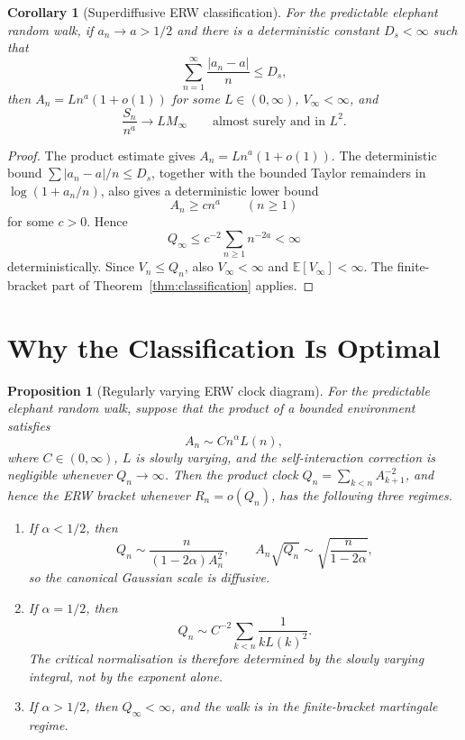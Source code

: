 \documentclass[11pt]{article}
\newtheorem{proposition}{Proposition}
\newtheorem{corollary}{Corollary}
\theoremstyle{definition}
\theoremstyle{remark}
\newcommand{\E}{\mathbb{E}}
\newcommand{\1}{\mathbf{1}}
\begin{document}
\begin{corollary}[Superdiffusive ERW classification]\label{cor:super}
For the predictable elephant random walk, if \(a_n\to a>1/2\) and there is a
deterministic constant \(D_s<\infty\) such
that
\[
  \sum_{n=1}^\infty \frac{|a_n-a|}{n}\le D_s,
\]
then \(A_n=L n^a(1+o(1))\) for some \(L\in(0,\infty)\), \(V_\infty<\infty\),
and
\[
  \frac{S_n}{n^a}\longrightarrow L M_\infty
  \qquad\text{almost surely and in }L^2.
\]
\end{corollary}

\begin{proof}
The product estimate gives \(A_n=L n^a(1+o(1))\). The deterministic bound
\(\sum |a_n-a|/n\le D_s\), together with the bounded Taylor remainders in
\(\log(1+a_n/n)\), also gives a deterministic lower bound
\[
  A_n\ge c n^a
  \qquad(n\ge1)
\]
for some \(c>0\). Hence
\[
  Q_\infty\le c^{-2}\sum_{n\ge1}n^{-2a}<\infty
\]
deterministically. Since \(V_n\le Q_n\), also \(V_\infty<\infty\) and
\(\E[V_\infty]<\infty\). The finite-bracket part of
Theorem~\ref{thm:classification} applies.
\end{proof}

\section{Why the Classification Is Optimal}\label{sec:optimality}

\begin{proposition}[Regularly varying ERW clock diagram]\label{prop:rv-phase}
For the predictable elephant random walk, suppose that the product of a bounded
environment satisfies
\[
  A_n\sim C n^\alpha L(n),
\]
where \(C\in(0,\infty)\), \(L\) is slowly varying, and the self-interaction
correction is negligible whenever \(Q_n\to\infty\). Then the product clock
\(Q_n=\sum_{k<n}A_{k+1}^{-2}\), and hence the ERW bracket whenever
\(R_n=o(Q_n)\), has the following three regimes.
\begin{enumerate}
  \item If \(\alpha<1/2\), then
  \[
    Q_n\sim \frac{n}{(1-2\alpha)A_n^2},
    \qquad
    A_n\sqrt{Q_n}\sim\sqrt{\frac{n}{1-2\alpha}},
  \]
  so the canonical Gaussian scale is diffusive.
  \item If \(\alpha=1/2\), then
  \[
    Q_n\sim C^{-2}\sum_{k<n}\frac1{kL(k)^2}.
  \]
  The critical normalisation is therefore determined by the slowly varying
  integral, not by the exponent alone.
  \item If \(\alpha>1/2\), then \(Q_\infty<\infty\), and the walk is in the
  finite-bracket martingale regime.
\end{enumerate}
\end{proposition}
\end{document}
